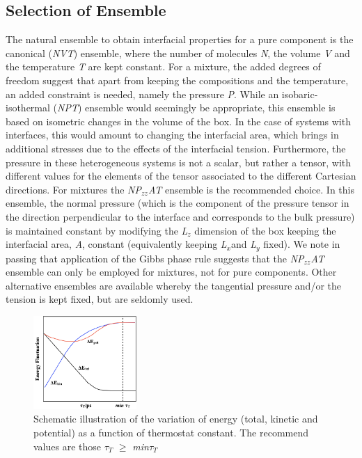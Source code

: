 \documentclass[9pt,bestpractices]{livecoms}
\begin{document}
\subsection{Selection of Ensemble}
\label{sec:ensemble}
The natural ensemble to obtain interfacial properties for a pure component is
the canonical (\textit{NVT}) ensemble, where the number of molecules
\textit{N}, the volume \textit{V} and the temperature \textit{T} are kept
constant\textit{.} For a mixture, the added degrees of freedom suggest that
apart from keeping the compositions and the temperature, an added constraint is
needed, namely the pressure \textit{P}. While an isobaric-isothermal
(\textit{NPT}) ensemble would seemingly be appropriate, this ensemble is based
on isometric changes in the volume of the box. In the case of systems with
interfaces, this would amount to changing the interfacial area, which brings in
additional stresses due to the effects of the interfacial tension. Furthermore,
the pressure in these heterogeneous systems is not a scalar, but rather
a tensor, with different values for the elements of the tensor associated to
the different Cartesian directions.  For mixtures the
\textit{NP}$_{zz}$\textit{AT} ensemble is the recommended choice. In this
ensemble, the normal pressure (which is the component of the pressure tensor in
the direction perpendicular to the interface and corresponds to the bulk
pressure) is maintained constant by modifying the \textit{L}$_{z}$ dimension of
the box keeping the interfacial area, \textit{A}, constant (equivalently
keeping \textit{L}$_{x }$and \textit{L}$_{y}$ fixed). We note in passing that
application of the Gibbs phase rule suggests that the
\textit{NP}$_{zz}$\textit{AT} ensemble can only be employed for mixtures, not
for pure components. Other alternative ensembles are available
\citep{zhang1995} whereby the tangential pressure and/or the tension
is kept fixed, but are seldomly used.  


\begin{figure}
\includegraphics[width=0.35\textwidth]{gfx/image25.png}
\caption{Schematic illustration of the variation of energy (total, kinetic and potential) as a function of thermostat constant. The recommend values are those ${\tau}$$_{ T}$ ${\geq}$ \textit{min${\tau}$}$_{T}$}
\label{fig:5b}
\end{figure}
\end{document}
